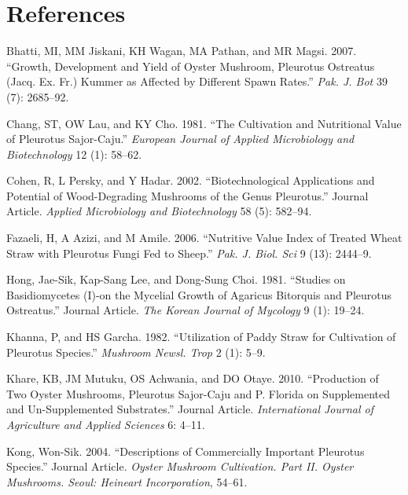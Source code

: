\documentclass[]{article}
\begin{document}
\hypertarget{references}{%
\section*{References}\label{references}}

\hypertarget{refs}{}
\leavevmode\hypertarget{ref-bhatti2007growth}{}%
Bhatti, MI, MM Jiskani, KH Wagan, MA Pathan, and MR Magsi. 2007. ``Growth, Development and Yield of Oyster Mushroom, Pleurotus Ostreatus (Jacq. Ex. Fr.) Kummer as Affected by Different Spawn Rates.'' \emph{Pak. J. Bot} 39 (7): 2685--92.

\leavevmode\hypertarget{ref-chang1981cultivation}{}%
Chang, ST, OW Lau, and KY Cho. 1981. ``The Cultivation and Nutritional Value of Pleurotus Sajor-Caju.'' \emph{European Journal of Applied Microbiology and Biotechnology} 12 (1): 58--62.

\leavevmode\hypertarget{ref-cohen2002}{}%
Cohen, R, L Persky, and Y Hadar. 2002. ``Biotechnological Applications and Potential of Wood-Degrading Mushrooms of the Genus Pleurotus.'' Journal Article. \emph{Applied Microbiology and Biotechnology} 58 (5): 582--94.

\leavevmode\hypertarget{ref-fazaeli2006nutritive}{}%
Fazaeli, H, A Azizi, and M Amile. 2006. ``Nutritive Value Index of Treated Wheat Straw with Pleurotus Fungi Fed to Sheep.'' \emph{Pak. J. Biol. Sci} 9 (13): 2444--9.

\leavevmode\hypertarget{ref-hong1981}{}%
Hong, Jae-Sik, Kap-Sang Lee, and Dong-Sung Choi. 1981. ``Studies on Basidiomycetes (I)-on the Mycelial Growth of Agaricus Bitorquis and Pleurotus Ostreatus.'' Journal Article. \emph{The Korean Journal of Mycology} 9 (1): 19--24.

\leavevmode\hypertarget{ref-khanna1982utilization}{}%
Khanna, P, and HS Garcha. 1982. ``Utilization of Paddy Straw for Cultivation of Pleurotus Species.'' \emph{Mushroom Newsl. Trop} 2 (1): 5--9.

\leavevmode\hypertarget{ref-khare2010}{}%
Khare, KB, JM Mutuku, OS Achwania, and DO Otaye. 2010. ``Production of Two Oyster Mushrooms, Pleurotus Sajor-Caju and P. Florida on Supplemented and Un-Supplemented Substrates.'' Journal Article. \emph{International Journal of Agriculture and Applied Sciences} 6: 4--11.

\leavevmode\hypertarget{ref-kong2004}{}%
Kong, Won-Sik. 2004. ``Descriptions of Commercially Important Pleurotus Species.'' Journal Article. \emph{Oyster Mushroom Cultivation. Part II. Oyster Mushrooms. Seoul: Heineart Incorporation}, 54--61.
\end{document}
